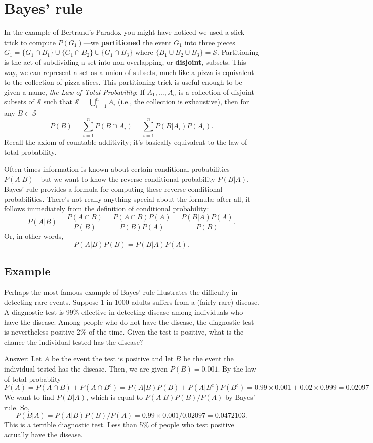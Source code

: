 \documentclass[]{book}
\begin{document}
\section{Bayes' rule}\label{bayes-rule}

In the example of Bertrand's Paradox you might have noticed we used a
slick trick to compute \(P(G_1)\)---we \textbf{partitioned} the event
\(G_1\) into three pieces
\(G_1 = \{G_1 \cap B_1\}\cup \{G_1 \cap B_2\}\cup \{G_1 \cap B_3\}\)
where \(\{B_1 \cup B_2 \cup B_3\} = \mathcal{S}\). Partitioning is the
act of subdividing a set into non-overlapping, or \textbf{disjoint},
subsets. This way, we can represent a set as a union of subsets, much
like a pizza is equivalent to the collection of pizza slices. This
partitioning trick is useful enough to be given a name, \emph{the Law of
Total Probability}: If \(A_1, \ldots, A_n\) is a collection of disjoint
subsets of \(\mathcal{S}\) such that
\(\mathcal{S} = \bigcup_{i=1}^n A_i\) (i.e., the collection is
exhaustive), then for any \(B\subset \mathcal{S}\)
\[P(B) = \sum_{i=1}^n P(B \cap A_i) = \sum_{i=1}^n P(B | A_i)P(A_i).\]
Recall the axiom of countable additivity; it's basically equivalent to
the law of total probability.

Often times information is known about certain conditional
probabilities---\(P(A|B)\)---but we want to know the reverse conditional
probability \(P(B|A)\). Bayes' rule provides a formula for computing
these reverse conditional probabilities. There's not really anything
special about the formula; after all, it follows immediately from the
definition of conditional probability:
\[P(A|B) = \frac{P(A\cap B)}{P(B)} = \frac{P(A\cap B)P(A)}{P(B)P(A)} = \frac{P(B|A)P(A)}{P(B)}.\]
Or, in other words, \[P(A|B)P(B) = P(B|A)P(A).\]

\subsection{Example}\label{example-3}

Perhaps the most famous example of Bayes' rule illustrates the
difficulty in detecting rare events. Suppose 1 in 1000 adults suffers
from a (fairly rare) disease. A diagnostic test is 99\% effective in
detecting disease among individuals who have the disease. Among people
who do not have the disease, the diagnostic test is nevertheless
positive 2\% of the time. Given the test is positive, what is the chance
the individual tested has the disease?

Answer: Let \(A\) be the event the test is positive and let \(B\) be the
event the individual tested has the disease. Then, we are given
\(P(B) = 0.001\). By the law of total probablity
\[P(A) = P(A\cap B)+P(A\cap B^c) = P(A| B)P(B)+P(A| B^c)P(B^c) = 0.99\times 0.001 + 0.02\times 0.999 = 0.02097\]
We want to find \(P(B|A)\), which is equal to \(P(A|B)P(B)/P(A)\) by
Bayes' rule. So,
\[P(B|A) = P(A|B)P(B)/P(A) = 0.99\times 0.001 / 0.02097 = 0.0472103.\]
This is a terrible diagnostic test. Less than 5\% of people who test
positive actually have the disease.
\end{document}
